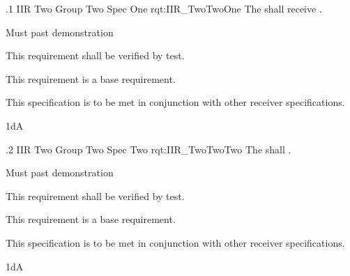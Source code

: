 \ONERQMTV
{\RqtNumberBase.1}
{IIR Two Group Two Spec One}
{rqt:IIR_TwoTwoOne}
{The \ThisSys{} shall receive \TBD.}
{
	\item [Phase 1] Must past demonstration
}
{This requirement shall be verified by test.}
{
	\item [N/A] This requirement is a base requirement.
}
{
	\item This specification is to be met in conjunction with other receiver specifications.
}
{1dA}

\ONERQMTV
{\RqtNumberBase.2}
{IIR Two Group Two Spec Two}
{rqt:IIR_TwoTwoTwo}
{The \ThisSys{} shall \TBD.}
{
	\item [Phase 1] Must past demonstration
}
{This requirement shall be verified by test.}
{
	\item [N/A] This requirement is a base requirement.
}
{
	\item This specification is to be met in conjunction with other receiver specifications.
}
{1dA}
